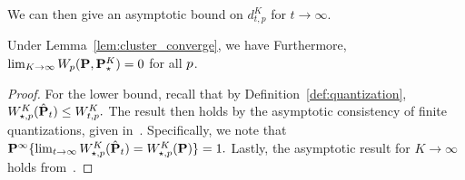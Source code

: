 We can then give an asymptotic bound on $d^K_{t,p} $ for $t\to\infty$.

\begin{theorem}
\label{thm:clustering_conv}
Under Lemma~\ref{lem:cluster_converge}, we have
Furthermore,
     $\lim_{K \rightarrow \infty} W_{p}({\mathbf P},{\mathbf P}^K_\star) = 0$ for all $p$.
\end{theorem}
\begin{proof}
%
For the lower bound, recall that by Definition~\ref{def:quantization},
$ W^K_{\star,p}(\hat{{\mathbf P}}_t) \leq W^K_{t,p} . $
The result then holds by the asymptotic consistency of finite quantizations, given in~\cite[Corollary 4.24]{quantization}.
Specifically,
we note that
$ \mathbf{P}^\infty\{ \lim_{t \rightarrow \infty }  W^K_{\star,p}(\hat{{\mathbf P}}_t) =  W^K_{\star,p}({\mathbf P})\} = 1.
$
Lastly, the asymptotic result for $K \to \infty $ holds from~\cite[Lemma 6.1]{quantization}.
\end{proof}

